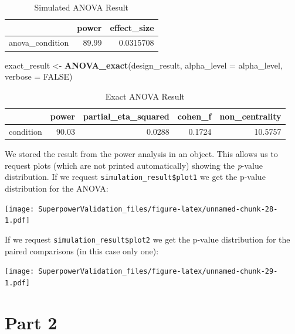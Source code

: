 \documentclass[]{book}
\newenvironment{Shaded}{\begin{snugshade}}{\end{snugshade}}
\newcommand{\DataTypeTok}[1]{\textcolor[rgb]{0.13,0.29,0.53}{#1}}
\newcommand{\KeywordTok}[1]{\textcolor[rgb]{0.13,0.29,0.53}{\textbf{#1}}}
\newcommand{\NormalTok}[1]{#1}
\newcommand{\OtherTok}[1]{\textcolor[rgb]{0.56,0.35,0.01}{#1}}
\newcommand{\StringTok}[1]{\textcolor[rgb]{0.31,0.60,0.02}{#1}}
\begin{document}
\begin{table}[t]

\caption{\label{tab:unnamed-chunk-25}Simulated ANOVA Result}
\centering
\begin{tabular}{l|r|r}
\hline
  & power & effect\_size\\
\hline
anova\_condition & 89.99 & 0.0315708\\
\hline
\end{tabular}
\end{table}

\begin{Shaded}
\begin{Highlighting}[]
\NormalTok{exact_result <-}\StringTok{ }\KeywordTok{ANOVA_exact}\NormalTok{(design_result,}
                            \DataTypeTok{alpha_level =}\NormalTok{ alpha_level,}
                            \DataTypeTok{verbose =} \OtherTok{FALSE}\NormalTok{)}
\end{Highlighting}
\end{Shaded}

\begin{table}[t]

\caption{\label{tab:unnamed-chunk-27}Exact ANOVA Result}
\centering
\begin{tabular}{l|r|r|r|r}
\hline
  & power & partial\_eta\_squared & cohen\_f & non\_centrality\\
\hline
condition & 90.03 & 0.0288 & 0.1724 & 10.5757\\
\hline
\end{tabular}
\end{table}

We stored the result from the power analysis in an object. This allows us to request plots (which are not printed automatically) showing the \emph{p}-value distribution. If we request \texttt{simulation\_result\$plot1} we get the p-value distribution for the ANOVA:

\texttt{[image: SuperpowerValidation\_files/figure-latex/unnamed-chunk-28-1.pdf]}

If we request \texttt{simulation\_result\$plot2} we get the p-value distribution for the paired comparisons (in this case only one):

\texttt{[image: SuperpowerValidation\_files/figure-latex/unnamed-chunk-29-1.pdf]}

\hypertarget{part-2}{%
\section{Part 2}\label{part-2}}
\end{document}
